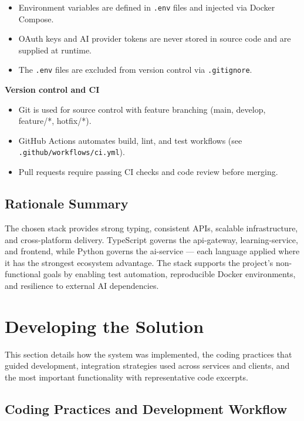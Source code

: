 \begin{itemize}
    \item Environment variables are defined in \texttt{.env} files and injected via Docker Compose.
    \item OAuth keys and AI provider tokens are never stored in source code and are supplied at runtime.
    \item The \texttt{.env} files are excluded from version control via \texttt{.gitignore}.
\end{itemize}

\textbf{Version control and CI}

\begin{itemize}
    \item Git is used for source control with feature branching (main, develop, feature/*, hotfix/*).
    \item GitHub Actions automates build, lint, and test workflows (see \texttt{.github/workflows/ci.yml}).
    \item Pull requests require passing CI checks and code review before merging.
\end{itemize}

\subsection{Rationale Summary}

The chosen stack provides strong typing, consistent APIs, scalable infrastructure, and cross-platform delivery. TypeScript governs the api-gateway, learning-service, and frontend, while Python governs the ai-service --- each language applied where it has the strongest ecosystem advantage. The stack supports the project's non-functional goals by enabling test automation, reproducible Docker environments, and resilience to external AI dependencies.

\section{Developing the Solution}

This section details how the system was implemented, the coding practices that guided development, integration strategies used across services and clients, and the most important functionality with representative code excerpts.

\subsection{Coding Practices and Development Workflow}

